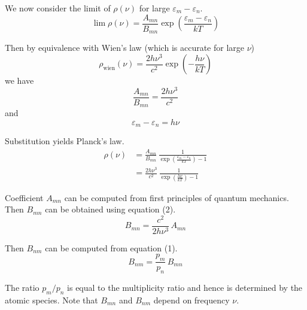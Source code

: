 \documentclass[12pt]{article}
\newcommand\BNM{B_{nm}} %
\newcommand\BMN{B_{mn}} %
\newcommand\AMN{A_{mn}} %
\begin{document}
\noindent
We now consider the limit of $\rho(\nu)$ for large $\varepsilon_m-\varepsilon_n$.
\begin{equation*}
\lim\rho(\nu)
=\frac{\AMN}{\BMN}\exp\left(\frac{\varepsilon_m-\varepsilon_n}{kT}\right)
\end{equation*}

\noindent
Then by equivalence with Wien's law (which is accurate for large $\nu$)
\begin{equation*}
\rho_\text{wien}(\nu)=\frac{2h\nu^3}{c^2}\exp\left(-\frac{h\nu}{kT}\right)
\end{equation*}
we have
\begin{equation*}
\frac{\AMN}{\BMN}=\frac{2h\nu^3}{c^2}
\tag{2}
\end{equation*}
and
\begin{equation*}
\varepsilon_m-\varepsilon_n=h\nu
\end{equation*}

\noindent
Substitution yields Planck's law.
\begin{align*}
\rho(\nu)
&=\frac{\AMN}{\BMN}\,\frac{1}{\exp\left(\frac{\varepsilon_m-\varepsilon_n}{kT}\right)-1}
\\[2ex]
&=\frac{2h\nu^3}{c^2}\,\frac{1}{\exp\left(\frac{h\nu}{kT}\right)-1}
\end{align*}

\bigskip
\noindent
Coefficient $\AMN$ can be computed from first principles of quantum mechanics.
Then $\BMN$ can be obtained using equation (2).
\begin{equation*}
\BMN=\frac{c^2}{2h\nu^3}\,\AMN
\end{equation*}

\noindent
Then $\BNM$ can be computed from equation (1).
\begin{equation*}
\BNM=\frac{p_m}{p_n}\,\BMN
\end{equation*}

\noindent
The ratio $p_m/p_n$ is equal to the multiplicity ratio
and hence is determined by the atomic species.
Note that $\BMN$ and $\BNM$ depend on frequency $\nu$.
\end{document}
